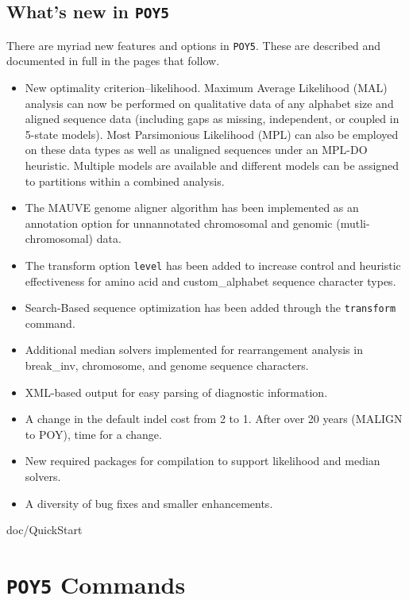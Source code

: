 \documentclass[11pt]{book}
\newcommand{\commandstyle}[1]{\texttt{#1}}
\newcommand{\poy}{\commandstyle{POY5}\xspace}
\begin{document}
\section{What's new in \poy}
There are myriad new features and options in \poy.  These are described and documented in full in the pages that follow.  
\begin{itemize}
\item{New optimality criterion--likelihood.  Maximum Average Likelihood (MAL) analysis
can now be performed on qualitative data of any alphabet size and aligned sequence data 
(including gaps as missing, independent, or coupled in 5-state models).  Most Parsimonious Likelihood (MPL)
can also be employed on these data types as well as unaligned sequences under an MPL-DO heuristic.  
Multiple models are available and different models can be assigned to partitions within a combined analysis. 
}
\item{The MAUVE genome aligner algorithm has been implemented as an annotation option
for unnannotated chromosomal and genomic (mutli-chromosomal) data.}
\item{The transform option \texttt{level} has been added to increase control and heuristic effectiveness 
for amino acid and custom\_alphabet sequence character types.}
\item{Search-Based sequence optimization has been added through the \texttt{transform} command.}
\item{Additional median solvers implemented for rearrangement analysis in break\_inv, chromosome, and genome 
sequence characters.}
\item{XML-based output for easy parsing of diagnostic information.}
\item{A change in the default indel cost from 2 to 1.  After over 20 years (MALIGN to POY), time for a change.}
\item{New required packages for compilation to support likelihood and median solvers.}
\item{A diversity of bug fixes and smaller enhancements.}
\end{itemize}


 {doc/QuickStart}

\chapter{\poy Commands}\label{commands}
\end{document}
